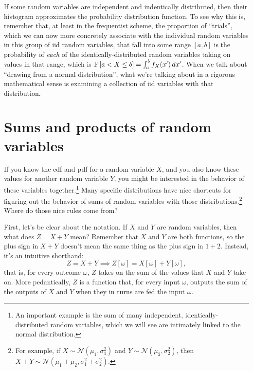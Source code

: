 If some random variables are independent and indentically distributed, then
their histogram approximates the probability distribution function. To see why
this is, remember that, at least in the frequentist scheme, the proportion of
``trials'', which we can now more concretely associate with the individual
random variables in this group of iid random variables, that fall into some
range $[a, b]$ is the probability of \emph{each} of the identically-distributed
random variables taking on values in that range, which is $\mathbb{P}\left[{a
< X \leq b}\right] = \int_a^b f_X(x') \,dx'$. When we talk about ``drawing from a
normal distribution'', what we're talking about in a rigorous mathematical
sense is examining a collection of iid variables with that distribution.

\section{Sums and products of random variables}

If you know the cdf and pdf for a random variable $X$, and you also know these
values for another random variable $Y$, you might be interested in the
behavior of these variables together.\footnote{An important example is the sum
of many independent, identically-distributed random variables, which we will
see are intimately linked to the normal distribution.} Many specific
distributions have nice shortcuts for figuring out the behavior of sums of
random variables with those distributions.\footnote{For example, if $X \sim
\mathcal{N}(\mu_1, \sigma_1^2)$ and $Y \sim \mathcal{N}(\mu_2, \sigma_2^2)$,
then $X + Y \sim \mathcal{N}(\mu_1 + \mu_2, \sigma_1^2 + \sigma_2^2)$.} Where
do those nice rules come from?

First, let's be clear about the notation. If $X$ and $Y$ are random variables,
then what does $Z = X + Y$ mean? Remember that $X$ and $Y$ are both functions,
so the plus sign in $X + Y$ doesn't mean the same thing as the plus sign in $1
+ 2$. Instead, it's an intuitive shorthand:
\begin{equation}
Z = X + Y \implies Z[\omega] = X[\omega] + Y[\omega],
\end{equation}
that is, for every outcome $\omega$, $Z$ takes on the sum of the values that
$X$ and $Y$ take on. More pedantically, $Z$ is a function that, for every input
$\omega$, outputs the sum of the outputs of $X$ and $Y$ when they in turns are
fed the input $\omega$.

